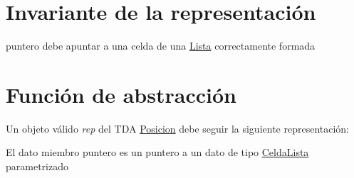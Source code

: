 \hypertarget{repPosicion_invPosicion}{}\section{Invariante de la representación}\label{repPosicion_invPosicion}

\begin{DoxyItemize}
\item puntero debe apuntar a una celda de una \mbox{\hyperlink{classLista}{Lista}} correctamente formada 
\end{DoxyItemize}\hypertarget{repPosicion_faPosicion}{}\section{Función de abstracción}\label{repPosicion_faPosicion}
Un objeto válido {\itshape rep} del T\+DA \mbox{\hyperlink{classPosicion}{Posicion}} debe seguir la siguiente representación\+:
\begin{DoxyItemize}
\item El dato miembro puntero es un puntero a un dato de tipo \mbox{\hyperlink{structCeldaLista}{Celda\+Lista}} parametrizado 
\end{DoxyItemize}